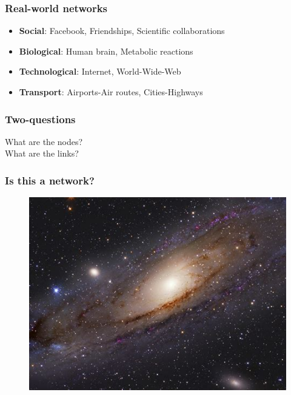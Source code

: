 \documentclass{beamer}
\begin{document}
\begin{frame}
    \frametitle{Real-world networks}
    \begin{itemize}
        \setlength\itemsep{1em}
            \item{{\bf Social}: Facebook, Friendships, Scientific collaborations}
            \item{{\bf Biological}: Human brain, Metabolic reactions }
            \item{{\bf Technological}: Internet, World-Wide-Web}
            \item{{\bf Transport}: Airports-Air routes, Cities-Highways}
    \end{itemize}
\end{frame}
\begin{frame}
    \frametitle{Two-questions}
        \begin{center}
            {\huge What are the nodes?}\\
            \vspace{5em}
            {\huge What are the links?}
        \end{center}
\end{frame}
\begin{frame}
    \frametitle{Is this a network?}

\begin{figure}
    \begin{center}
        \includegraphics[width=0.6\columnwidth]{galaxy.jpeg}
    \end{center}
\end{figure}

\end{frame}
\end{document}
